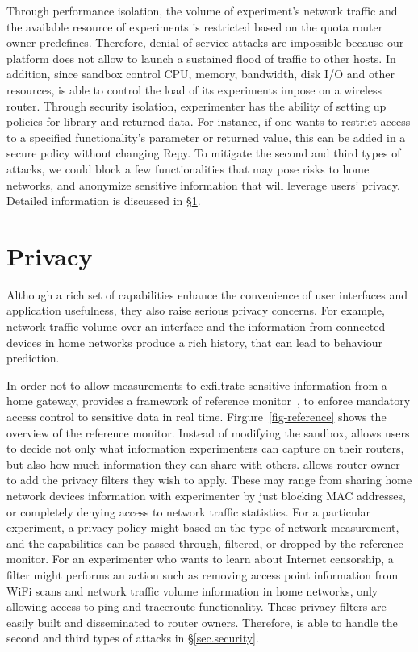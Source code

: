 Through performance isolation, the volume of experiment's network traffic and the available resource of experiments is restricted based on the quota router owner predefines. Therefore, denial of service attacks are impossible because our platform does not allow to launch a sustained flood of traffic to other hosts. In addition, since sandbox control CPU, memory, bandwidth, disk I/O and other resources, \sysname is able to control the load of its experiments impose on a wireless router. Through security isolation, experimenter has the ability of setting up policies for library and returned data. For instance, if one wants to restrict access to a specified functionality's parameter or returned value, this can be added in a secure policy without changing Repy. To mitigate the second and third types of attacks, we could block a few functionalities that may pose risks to home networks, and anonymize sensitive information that will leverage users' privacy. Detailed information is discussed in \S{\ref{sec.privacy}}. 

\section{Privacy}
\label{sec.privacy}
Although a rich set of capabilities enhance the convenience of user interfaces and application usefulness, they also raise serious privacy concerns. For example, network traffic volume over an interface and the information from connected devices in home networks produce a rich history, that can lead to behaviour prediction. 

In order not to allow measurements to exfiltrate sensitive information from a home gateway, \sysname provides a framework of reference monitor~\cite{ref}, to enforce mandatory access control to sensitive data in real time. Firgure~\ref{fig-reference} shows the overview of the reference monitor. Instead of modifying the sandbox, \sysname allows users to decide not only what information experimenters can capture on their routers, but also how much information they can share with others. \sysname allows router owner to add the privacy filters they wish to apply. These may range from sharing home network devices information with experimenter by just blocking MAC addresses, or completely denying access to network traffic statistics. For a particular experiment, a privacy policy might based on the type of network measurement, and the capabilities can be passed through, filtered, or dropped by the reference monitor. For an experimenter who wants to learn about Internet censorship, a filter might performs an action such as removing access point information from WiFi scans and network traffic volume information in home networks, only allowing access to ping and traceroute functionality. These privacy filters are easily built and disseminated to router owners. Therefore, \sysname is able to handle the second and third types of attacks in \S{\ref{sec.security}}. 

